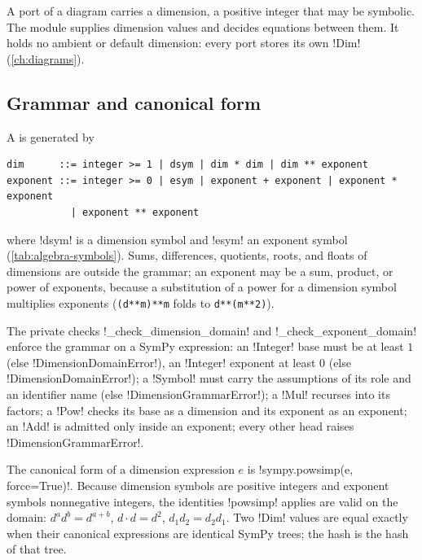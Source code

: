 A port of a diagram carries a dimension, a positive integer that may be symbolic. The module  supplies dimension values and decides equations between them. It holds no ambient or default dimension: every port stores its own \py!Dim! (\cref{ch:diagrams}).

\subsection{Grammar and canonical form}

\begin{definition}\label{def:algebra-dim-grammar}
A  is generated by
\begin{lstlisting}[style=grammar]
dim      ::= integer >= 1 | dsym | dim * dim | dim ** exponent
exponent ::= integer >= 0 | esym | exponent + exponent | exponent * exponent
           | exponent ** exponent
\end{lstlisting}
where \code!dsym! is a dimension symbol and \code!esym! an exponent symbol (\cref{tab:algebra-symbols}). Sums, differences, quotients, roots, and floats of dimensions are outside the grammar; an exponent may be a sum, product, or power of exponents, because a substitution of a power for a dimension symbol multiplies exponents (\texttt{(d**m)**m} folds to \texttt{d**(m**2)}).
\end{definition}

The private checks \py!_check_dimension_domain! and \py!_check_exponent_domain! enforce the grammar on a SymPy expression: an \py!Integer! base must be at least $1$ (else \py!DimensionDomainError!), an \py!Integer! exponent at least $0$ (else \py!DimensionDomainError!); a \py!Symbol! must carry the assumptions of its role and an identifier name (else \py!DimensionGrammarError!); a \py!Mul! recurses into its factors; a \py!Pow! checks its base as a dimension and its exponent as an exponent; an \py!Add! is admitted only inside an exponent; every other head raises \py!DimensionGrammarError!.

\begin{definition}\label{def:algebra-dim-canon}
The canonical form of a dimension expression $e$ is \py!sympy.powsimp(e, force=True)!. Because dimension symbols are positive integers and exponent symbols nonnegative integers, the identities \py!powsimp! applies are valid on the domain: $d^a d^b=d^{a+b}$, $d\cdot d=d^2$, $d_1d_2=d_2d_1$. Two \py!Dim! values are equal exactly when their canonical expressions are identical SymPy trees; the hash is the hash of that tree.
\end{definition}

